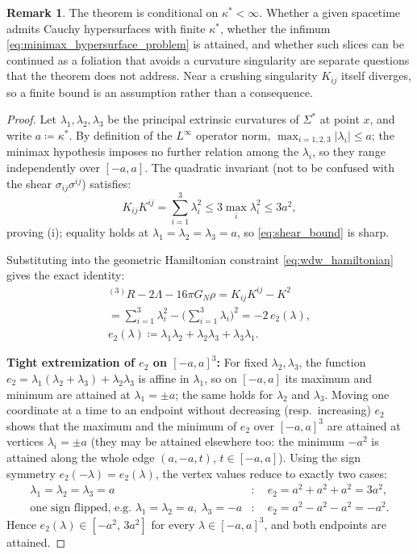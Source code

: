 \documentclass[11pt,a4paper,reqno]{amsart}
\theoremstyle{definition}
\newtheorem{remark}[theorem]{Remark}
\numberwithin{equation}{section}
\begin{document}
\begin{remark}
The theorem is conditional on $\kappa^* < \infty$. Whether a given spacetime admits Cauchy hypersurfaces with finite $\kappa^*$, whether the infimum \eqref{eq:minimax_hypersurface_problem} is attained, and whether such slices can be continued as a foliation that avoids a curvature singularity are separate questions that the theorem does not address. Near a crushing singularity $K_{ij}$ itself diverges, so a finite bound is an assumption rather than a consequence.
\end{remark}
\begin{proof}
Let $\lambda_1, \lambda_2, \lambda_3$ be the principal extrinsic curvatures of $\Sigma^*$ at point $x$, and write $a \coloneqq \kappa^*$. By definition of the $L^\infty$ operator norm, $\max_{i=1,2,3} |\lambda_i| \le a$; the minimax hypothesis imposes no further relation among the $\lambda_i$, so they range independently over $[-a,a]$. The quadratic invariant (not to be confused with the shear $\sigma_{ij}\sigma^{ij}$) satisfies:
\begin{equation}
    K_{ij} K^{ij} = \sum_{i=1}^3 \lambda_i^2 \le 3 \max_i \lambda_i^2 \le 3 a^2,
\end{equation}
proving (i); equality holds at $\lambda_1 = \lambda_2 = \lambda_3 = a$, so \eqref{eq:shear_bound} is sharp.

Substituting into the geometric Hamiltonian constraint \eqref{eq:wdw_hamiltonian} gives the exact identity:
\begin{equation}
    \begin{gathered}
    {}^{(3)}R - 2\Lambda - 16\pi G_N\rho = K_{ij} K^{ij} - K^2 \\
    = \sum_{i=1}^3 \lambda_i^2 - \Big(\sum_{i=1}^3 \lambda_i\Big)^2 = -2\, e_2(\lambda), \\
    e_2(\lambda) \coloneqq \lambda_1 \lambda_2 + \lambda_2 \lambda_3 + \lambda_3 \lambda_1.
    \end{gathered}
\end{equation}

\textbf{Tight extremization of $e_2$ on $[-a,a]^3$:} For fixed $\lambda_2, \lambda_3$, the function $e_2 = \lambda_1(\lambda_2 + \lambda_3) + \lambda_2\lambda_3$ is affine in $\lambda_1$, so on $[-a,a]$ its maximum and minimum are attained at $\lambda_1 = \pm a$; the same holds for $\lambda_2$ and $\lambda_3$. Moving one coordinate at a time to an endpoint without decreasing (resp.\ increasing) $e_2$ shows that the maximum and the minimum of $e_2$ over $[-a,a]^3$ are attained at vertices $\lambda_i = \pm a$ (they may be attained elsewhere too: the minimum $-a^2$ is attained along the whole edge $(a, -a, t)$, $t \in [-a,a]$). Using the sign symmetry $e_2(-\lambda) = e_2(\lambda)$, the vertex values reduce to exactly two cases:
\begin{align}
    \lambda_1 = \lambda_2 = \lambda_3 = a &: \quad e_2 = a^2+a^2+a^2 = 3a^2, \\
    \text{one sign flipped, e.g. } \lambda_1=\lambda_2=a,\ \lambda_3=-a &: \quad e_2 = a^2 - a^2 - a^2 = -a^2.
\end{align}
Hence $e_2(\lambda) \in [-a^2,\, 3a^2]$ for every $\lambda \in [-a,a]^3$, and both endpoints are attained.


\end{proof}
\end{document}
